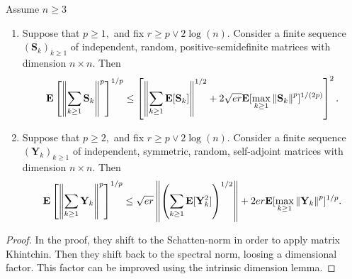 \begin{ftheorem}
  Assume $n\ge 3$
  \begin{enumerate}[label={(\roman*)}]
    \item
  Suppose that
  $
    p \ge 1
    ,
  $
  and fix
  $
    r
    \ge
    p
    \lor
    2\log(n)
    .
  $
  Consider a finite sequence
  $
    (\mathbf{S}_k)_{k\ge 1}
  $
  of independent, random, positive-semidefinite matrices 
  with dimension 
  $
    n\times n.
  $
  Then
  \begin{gather}
      \mathbf{E}
      \left[
        \left\lVert
          \sum_{k\ge 1}
            \mathbf{S}_k
        \right\rVert
        ^{p}
      \right]
      ^{1/p}
      \le
      \left[ 
        \left\lVert
          \sum_{k\ge 1}
          \mathbf{E}
          [
            \mathbf{S}_k
          ]
        \right\rVert^{1/2}
        +
        2
        \sqrt{e r}
        \mathbf{E}
        [
          \max_{k\ge 1}
          \left\lVert
            \mathbf{S}_k
          \right\rVert
          ^p
        ]
        ^{1/(2p)}
      \right]
      ^2
      .
  \end{gather}
    \item
  Suppose that
  $
    p \ge 2
    ,
  $
  and fix
  $
    r
    \ge
    p
    \lor
    2\log(n)
    .
  $
  Consider a finite sequence
  $
    (\mathbf{Y}_k)_{k\ge 1}
  $
  of independent, symmetric, random, self-adjoint matrices 
  with dimension 
  $
    n\times n.
  $
  Then
  \begin{gather}
      \mathbf{E}
      \left[
        \left\lVert
          \sum_{k\ge 1}
            \mathbf{Y}_k
        \right\rVert
        ^{p}
      \right]
      ^{1/p}
      \le
        \sqrt{e r}
        \left\lVert
          \left( 
          \sum_{k\ge 1}
          \mathbf{E}
          [
            \mathbf{Y}_k^2
          ]
          \right)
          ^{1/2}
        \right\rVert
        +
        2
        er
        \mathbf{E}
        [
          \max_{k\ge 1}
          \left\lVert
            \mathbf{Y}_k
          \right\rVert
          ^p
        ]
        ^{1/p}
      .
  \end{gather}

  \end{enumerate}
\end{ftheorem}
\begin{proof}
  \cite[Theorem A.1]{Chen2012}
  In the proof, they shift to the Schatten-norm in order to apply matrix Khintchin. Then they shift back to the spectral norm, loosing a dimensional factor. This factor can be improved using the intrinsic dimension lemma.
\end{proof}
 

